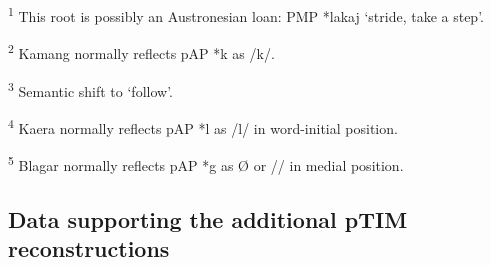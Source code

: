 \raggedright
 
\textsuperscript{1} This root is possibly an Austronesian loan: PMP *lakaj `stride, take a step'.  

\textsuperscript{2} Kamang normally reflects pAP *k as /k/.  

\textsuperscript{3} Semantic shift to `follow'. 

\textsuperscript{4} Kaera normally reflects pAP *l as /l/ in word-initial position.

\textsuperscript{5} Blagar normally reflects pAP *g as {\O} or /{\textglotstop}/ in medial position.

\newpage
\subsection{Data supporting the additional pTIM reconstructions}
\label{sec:3:app:2}
 
